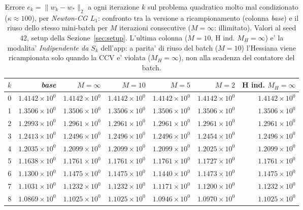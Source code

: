 \begin{table}[H]
\centering
\footnotesize
\renewcommand{\arraystretch}{0.85}
\setlength{\tabcolsep}{2pt}
\caption{Errore $e_k=\|w_k-w_*\|_2$ a ogni iterazione $k$ sul problema quadratico molto mal condizionato ($\kappa\approx 100$), per \emph{Newton-CG $L_1$}: confronto tra la versione a ricampionamento (colonna \emph{base}) e il riuso dello stesso mini-batch per $M$ iterazioni consecutive ($M=\infty$: illimitato). Valori al seed 42, setup della Sezione~\ref{sec:setup}. L'ultima colonna ($M{=}10$, H ind. $M_H{=}\infty$) e' la modalita' \emph{Indipendente da $S_k$} dell'app: a parita' di riuso del batch ($M=10$) l'Hessiana viene ricampionata solo quando la CCV e' violata ($M_H=\infty$), non alla scadenza del contatore del batch.}
\label{tab:riuso_veryill_l1}
\begin{tabular}{@{}rrrrrrr@{}}
\toprule
$k$ & \emph{base} & $M{=}\infty$ & $M{=}10$ & $M{=}5$ & $M{=}2$ & H ind. $M_H{=}\infty$\\
\midrule
0 & $1.4142\times10^{0}$ & $1.4142\times10^{0}$ & $1.4142\times10^{0}$ & $1.4142\times10^{0}$ & $1.4142\times10^{0}$ & $1.4142\times10^{0}$\\
1 & $1.3506\times10^{0}$ & $1.3506\times10^{0}$ & $1.3506\times10^{0}$ & $1.3506\times10^{0}$ & $1.3506\times10^{0}$ & $1.3506\times10^{0}$\\
2 & $1.2993\times10^{0}$ & $1.2961\times10^{0}$ & $1.2961\times10^{0}$ & $1.2961\times10^{0}$ & $1.2961\times10^{0}$ & $1.2961\times10^{0}$\\
3 & $1.2413\times10^{0}$ & $1.2496\times10^{0}$ & $1.2496\times10^{0}$ & $1.2496\times10^{0}$ & $1.2454\times10^{0}$ & $1.2496\times10^{0}$\\
4 & $1.2035\times10^{0}$ & $1.2099\times10^{0}$ & $1.2099\times10^{0}$ & $1.2099\times10^{0}$ & $1.2025\times10^{0}$ & $1.2099\times10^{0}$\\
5 & $1.1638\times10^{0}$ & $1.1761\times10^{0}$ & $1.1761\times10^{0}$ & $1.1761\times10^{0}$ & $1.1727\times10^{0}$ & $1.1761\times10^{0}$\\
6 & $1.1300\times10^{0}$ & $1.1475\times10^{0}$ & $1.1475\times10^{0}$ & $1.1440\times10^{0}$ & $1.1473\times10^{0}$ & $1.1475\times10^{0}$\\
7 & $1.1031\times10^{0}$ & $1.1232\times10^{0}$ & $1.1232\times10^{0}$ & $1.1171\times10^{0}$ & $1.1200\times10^{0}$ & $1.1232\times10^{0}$\\
8 & $1.0869\times10^{0}$ & $1.1025\times10^{0}$ & $1.1025\times10^{0}$ & $1.0946\times10^{0}$ & $1.0970\times10^{0}$ & $1.1025\times10^{0}$\\

\end{tabular}
\end{table}
